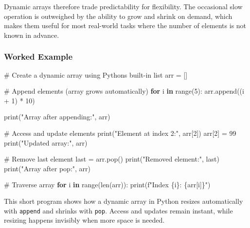 \documentclass[
  letterpaper,
  DIV=11,
  numbers=noendperiod]{scrreprt}
\newenvironment{Shaded}{\begin{snugshade}}{\end{snugshade}}
\newcommand{\BuiltInTok}[1]{\textcolor[rgb]{0.00,0.23,0.31}{#1}}
\newcommand{\CommentTok}[1]{\textcolor[rgb]{0.37,0.37,0.37}{#1}}
\newcommand{\ControlFlowTok}[1]{\textcolor[rgb]{0.00,0.23,0.31}{\textbf{#1}}}
\newcommand{\DecValTok}[1]{\textcolor[rgb]{0.68,0.00,0.00}{#1}}
\newcommand{\KeywordTok}[1]{\textcolor[rgb]{0.00,0.23,0.31}{\textbf{#1}}}
\newcommand{\NormalTok}[1]{\textcolor[rgb]{0.00,0.23,0.31}{#1}}
\newcommand{\OperatorTok}[1]{\textcolor[rgb]{0.37,0.37,0.37}{#1}}
\newcommand{\SpecialCharTok}[1]{\textcolor[rgb]{0.37,0.37,0.37}{#1}}
\newcommand{\SpecialStringTok}[1]{\textcolor[rgb]{0.13,0.47,0.30}{#1}}
\newcommand{\StringTok}[1]{\textcolor[rgb]{0.13,0.47,0.30}{#1}}
\begin{document}
Dynamic arrays therefore trade predictability for flexibility. The
occasional slow operation is outweighed by the ability to grow and
shrink on demand, which makes them useful for most real-world tasks
where the number of elements is not known in advance.

\subsubsection{Worked Example}\label{worked-example}

\begin{Shaded}
\begin{Highlighting}[]
\CommentTok{\# Create a dynamic array using Python\textquotesingle{}s built{-}in list}
\NormalTok{arr }\OperatorTok{=}\NormalTok{ []}

\CommentTok{\# Append elements (array grows automatically)}
\ControlFlowTok{for}\NormalTok{ i }\KeywordTok{in} \BuiltInTok{range}\NormalTok{(}\DecValTok{5}\NormalTok{):}
\NormalTok{    arr.append((i }\OperatorTok{+} \DecValTok{1}\NormalTok{) }\OperatorTok{*} \DecValTok{10}\NormalTok{)}

\BuiltInTok{print}\NormalTok{(}\StringTok{"Array after appending:"}\NormalTok{, arr)}

\CommentTok{\# Access and update elements}
\BuiltInTok{print}\NormalTok{(}\StringTok{"Element at index 2:"}\NormalTok{, arr[}\DecValTok{2}\NormalTok{])}
\NormalTok{arr[}\DecValTok{2}\NormalTok{] }\OperatorTok{=} \DecValTok{99}
\BuiltInTok{print}\NormalTok{(}\StringTok{"Updated array:"}\NormalTok{, arr)}

\CommentTok{\# Remove last element}
\NormalTok{last }\OperatorTok{=}\NormalTok{ arr.pop()}
\BuiltInTok{print}\NormalTok{(}\StringTok{"Removed element:"}\NormalTok{, last)}
\BuiltInTok{print}\NormalTok{(}\StringTok{"Array after pop:"}\NormalTok{, arr)}

\CommentTok{\# Traverse array}
\ControlFlowTok{for}\NormalTok{ i }\KeywordTok{in} \BuiltInTok{range}\NormalTok{(}\BuiltInTok{len}\NormalTok{(arr)):}
    \BuiltInTok{print}\NormalTok{(}\SpecialStringTok{f"Index }\SpecialCharTok{\{}\NormalTok{i}\SpecialCharTok{\}}\SpecialStringTok{: }\SpecialCharTok{\{}\NormalTok{arr[i]}\SpecialCharTok{\}}\SpecialStringTok{"}\NormalTok{)}
\end{Highlighting}
\end{Shaded}

This short program shows how a dynamic array in Python resizes
automatically with \texttt{append} and shrinks with \texttt{pop}. Access
and updates remain instant, while resizing happens invisibly when more
space is needed.
\end{document}

